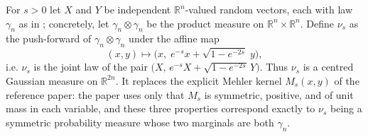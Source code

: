 \begin{definition}
For $s > 0$ let $X$ and $Y$ be independent $\mathbb{R}^n$-valued random vectors,
each with law $\gamma_n$ as in ; concretely, let
$\gamma_n \otimes \gamma_n$ be the product measure on
$\mathbb{R}^n \times \mathbb{R}^n$.  Define $\nu_s$ as the push-forward of
$\gamma_n \otimes \gamma_n$ under the affine map
\[
  (x, y) \longmapsto \bigl(x,\; e^{-s}x + \sqrt{1-e^{-2s}}\; y\bigr),
\]
i.e. $\nu_s$ is the joint law of the pair
$\bigl(X,\, e^{-s}X + \sqrt{1-e^{-2s}}\,Y\bigr)$.  Thus $\nu_s$ is a centred
Gaussian measure on $\mathbb{R}^{2n}$.  It replaces the explicit Mehler kernel
$M_s(x,y)$ of the reference paper: the paper uses only that $M_s$ is symmetric,
positive, and of unit mass in each variable, and these three properties
correspond exactly to $\nu_s$ being a symmetric probability measure whose two
marginals are both $\gamma_n$.
\end{definition}
